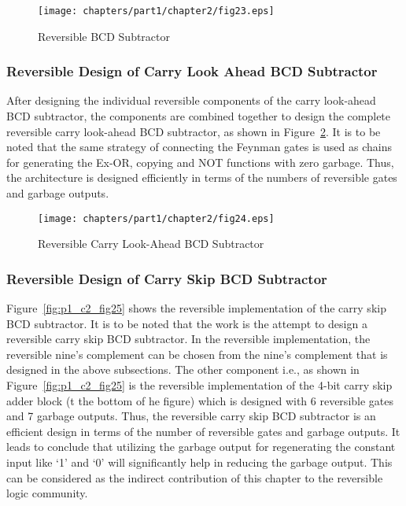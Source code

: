 \begin{figure}[!tbh]
	\centering
	\texttt{[image: chapters/part1/chapter2/fig23.eps]}
	\caption{Reversible BCD Subtractor}
	\label{fig:p1_c2_fig23}
\end{figure}

\subsubsection{Reversible Design of Carry Look Ahead BCD Subtractor}

After designing the individual reversible components of the carry look-ahead BCD subtractor, the components are combined together to design the complete reversible carry look-ahead BCD subtractor, as shown in Figure~\ref{fig:p1_c2_fig24}. It is to be noted that the same strategy of connecting the Feynman gates is used as chains for generating the Ex-OR, copying and NOT functions with zero garbage. Thus, the architecture is designed efficiently in terms of the numbers of reversible gates and garbage outputs.

\begin{figure}[!tbh]
	\centering
	\texttt{[image: chapters/part1/chapter2/fig24.eps]}
	\caption{Reversible Carry Look-Ahead BCD Subtractor}
	\label{fig:p1_c2_fig24}
\end{figure}

\subsubsection{Reversible Design of Carry Skip BCD Subtractor}

\noindent Figure~\ref{fig:p1_c2_fig25} shows the reversible implementation of the carry skip BCD subtractor. It is to be noted that the work is the attempt to design a reversible carry skip BCD subtractor. In the reversible implementation, the reversible nine's complement can be chosen from the nine's complement that is designed in the above subsections. The other component i.e., as shown in Figure~\ref{fig:p1_c2_fig25} is the reversible implementation of the 4-bit carry skip adder block (t the bottom of he figure) which is designed with 6 reversible gates and 7 garbage outputs. Thus, the reversible carry skip BCD subtractor is an efficient design in terms of the number of reversible gates and garbage outputs. It leads to conclude that utilizing the garbage output for regenerating the constant input like `1' and `0' will significantly help in reducing the garbage output. This can be considered as the indirect contribution of this chapter to the reversible logic community.


